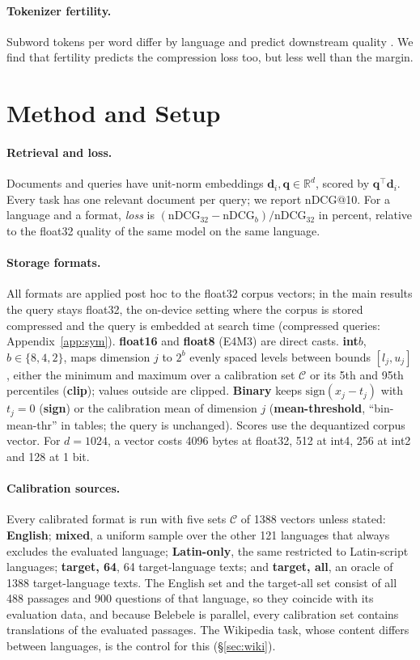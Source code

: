 \documentclass[11pt]{article}
\newcommand{\vq}{\mathbf{q}}
\newcommand{\vd}{\mathbf{d}}
\newcommand{\R}{\mathbb{R}}
\begin{document}
\paragraph{Tokenizer fertility.} Subword tokens per word differ by language and predict downstream quality \citep{rust2021tokenizer}. We find that fertility predicts the compression loss too, but less well than the margin.

\section{Method and Setup}\label{sec:method}
\paragraph{Retrieval and loss.} Documents and queries have unit-norm embeddings $\vd_i,\vq\in\R^d$, scored by $\vq^\top\vd_i$. Every task has one relevant document per query; we report nDCG@10. For a language and a format, \emph{loss} is $(\mathrm{nDCG}_{32}-\mathrm{nDCG}_{b})/\mathrm{nDCG}_{32}$ in percent, relative to the float32 quality of the same model on the same language.

\paragraph{Storage formats.} All formats are applied post hoc to the float32 corpus vectors; in the main results the query stays float32, the on-device setting where the corpus is stored compressed and the query is embedded at search time (compressed queries: Appendix~\ref{app:sym}). \textbf{float16} and \textbf{float8} (E4M3) are direct casts. \textbf{int$b$}, $b\in\{8,4,2\}$, maps dimension $j$ to $2^b$ evenly spaced levels between bounds $[l_j,u_j]$, either the minimum and maximum over a calibration set $\mathcal{C}$ \citep{shakir2024quant} or its 5th and 95th percentiles (\textbf{clip}); values outside are clipped. \textbf{Binary} keeps $\mathrm{sign}(x_j-t_j)$ with $t_j=0$ (\textbf{sign}) or the calibration mean of dimension $j$ (\textbf{mean-threshold}, ``bin-mean-thr'' in tables; the query is unchanged). Scores use the dequantized corpus vector. For $d=1024$, a vector costs 4096 bytes at float32, 512 at int4, 256 at int2 and 128 at 1 bit.

\paragraph{Calibration sources.} Every calibrated format is run with five sets $\mathcal{C}$ of 1388 vectors unless stated: \textbf{English}; \textbf{mixed}, a uniform sample over the other 121 languages that always excludes the evaluated language; \textbf{Latin-only}, the same restricted to Latin-script languages; \textbf{target, 64}, 64 target-language texts; and \textbf{target, all}, an oracle of 1388 target-language texts. The English set and the target-all set consist of all 488 passages and 900 questions of that language, so they coincide with its evaluation data, and because Belebele is parallel, every calibration set contains translations of the evaluated passages. The Wikipedia task, whose content differs between languages, is the control for this (\S\ref{sec:wiki}).
\end{document}
